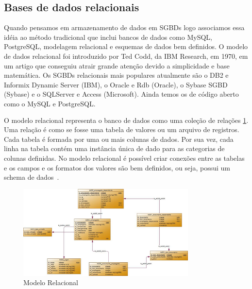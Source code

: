 \subsection{Bases de dados relacionais}

Quando pensamos em armazenamento de dados em SGBDs logo associamos essa idéia ao método tradicional que inclui bancos de dados como MySQL, PostgreSQL, modelagem relacional e esquemas de dados bem definidos. O modelo de dados relacional foi introduzido por Ted Codd, da IBM Research, em 1970, em um artigo que conseguiu atrair grande atenção devido a simplicidade e base matemática. Os SGBDs relacionais mais populares atualmente são o DB2 e Informix Dynamic Server (IBM), o Oracle e Rdb (Oracle), o Sybase SGBD (Sybase) e o SQLServer e Access (Microsoft). Ainda temos os de código aberto como o MySQL e PostgreSQL.

O modelo relacional representa o banco de dados como uma coleção de relações \ref{fig:modelorelacional}. Uma relação é como se fosse uma tabela de valores ou um arquivo de registros. Cada tabela é formada por uma ou mais colunas de dados. Por sua vez, cada linha na tabela contém uma instância única de dado para as categorias de colunas definidas. No modelo relacional é possível criar conexões entre as tabelas e os  campos e os formatos dos valores são bem definidos, ou seja, possui um schema de dados~\cite{SBElmasri,nosqlliveup}.

	\begin{figure}[!htbp]
		\begin{center}
			\includegraphics[width=0.8\textwidth]{modelo_relacional}
		\end{center}
		\caption{Modelo Relacional }
		\label{fig:modelorelacional}
	\end{figure}


